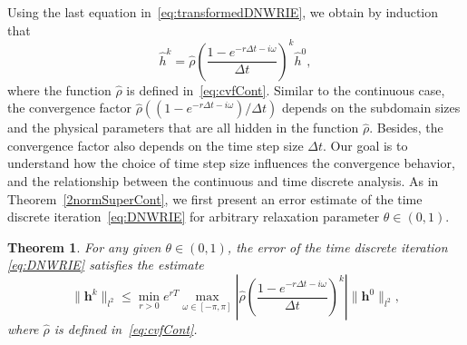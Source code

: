 \documentclass[10pt,a4paper]{amsart}
\newtheorem{theorem}{Theorem}
\begin{document}
Using the last equation in~\eqref{eq:transformedDNWRIE}, we obtain by induction that
\[\widehat h^k = \hat{\rho}\left(\frac{1-e^{-r \Delta t -i \omega}}{\Delta t}\right)^k \widehat h^0,\]
where the function $\hat{\rho}$ is defined in~\eqref{eq:cvfCont}. Similar to the continuous case, the convergence factor $\hat{\rho}((1-e^{-r \Delta t -i \omega})/\Delta t)$ depends on the subdomain sizes and the physical parameters that are all hidden in the function $\hat{\rho}$. Besides, the convergence factor also depends on the time step size $\Delta t$. Our goal is to understand how the choice of time step size influences the convergence behavior, and the relationship between the continuous and time discrete analysis. As in Theorem~\ref{2normSuperCont}, we first present an error estimate of the time discrete iteration~\eqref{eq:DNWRIE}
for arbitrary relaxation parameter $\theta\in(0, 1)$. 

\begin{theorem}\label{superLinearTimeDisc}
For any given $\theta\in(0, 1)$, the error of the time discrete iteration \eqref{eq:DNWRIE} satisfies the estimate 
\begin{equation}\label{eq:GenEstDis}
\|\boldsymbol{h}^k\|_{l^2} \leq \min_{r > 0} e^{rT}\max_{\omega \in [-\pi,\pi]} \left|\hat{\rho}\left(\frac{1-e^{-r \Delta t -i \omega}}{\Delta t}\right)^k\right| \|\boldsymbol{h}^0\|_{l^2},
\end{equation}
where $\hat{\rho}$ is defined in~\eqref{eq:cvfCont}.
\end{theorem}
\end{document}
